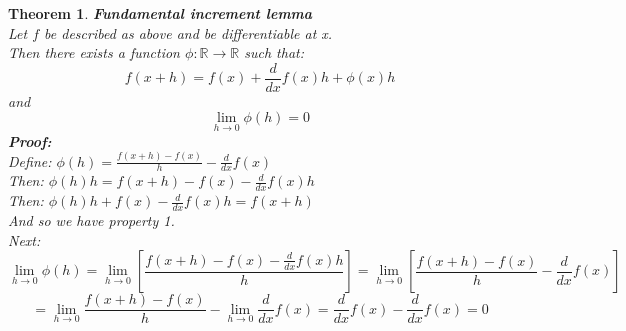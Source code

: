\documentclass[12pt]{extarticle}
\theoremstyle{plain}
\newtheorem{thm}{Theorem}[section]
\theoremstyle{plain}
\theoremstyle{Definition}
\theoremstyle{Definition}
\theoremstyle{plain}
\begin{document}
\begin{thm} \textbf{Fundamental increment lemma} \\ 
	Let $f$ be described as above and be differentiable at x. \\ 
	Then there exists a function $\phi : \mathbb{R} \to \mathbb{R}$ such that: \\ 
	$$f(x + h) = f(x) + \frac{d}{dx} f(x)h + \phi(x)h$$
	and 
	$$\lim_{h \to 0} \phi(h) = 0$$ 
	\textbf{Proof:} \\ 
	Define: $\phi(h) = \frac{f(x+h) - f(x)}{h} - \frac{d}{dx} f(x)$ \\ 
	Then: $\phi(h)h = f(x+h) - f(x) - \frac{d}{dx} f(x)h$ \\ 
	Then: $\phi(h)h + f(x) - \frac{d}{dx} f(x)h = f(x + h)$ \\ 
	And so we have property 1. \\ 
	Next: \\ 
	$$\lim_{h \to 0} \phi(h) = \lim_{h \to 0} \left[\frac{f(x+h) - f(x) - \frac{d}{dx} f(x)h}{h}\right] = \lim_{h \to 0} \left[\frac{f(x+h) - f(x)}{h} - \frac{d}{dx} f(x)\right] $$
	$$= \lim_{h \to 0}\frac{f(x+h) - f(x)}{h} - \lim_{h \to 0} \frac{d}{dx} f(x) = \frac{d}{dx} f(x) - \frac{d}{dx} f(x) = 0$$
\end{thm}
\end{document}
